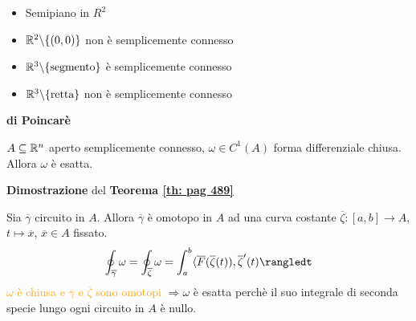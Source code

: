	
\begin{exbar}
\begin{example}
		\begin{itemize}
			\item Semipiano in $R^2$\\
			
			\segnaposto %
			
			\item $\mathbb{R}^2 \backslash \{(0,0)\}$ non è semplicemente connesso\\
			
			\segnaposto %
			
			\item $\mathbb{R}^3 \backslash \{\text{segmento}\}$ è semplicemente connesso\\
			
			\segnaposto %
			
			\item $\mathbb{R}^3 \backslash \{\text{retta}\}$ non è semplicemente connesso\\
			
			\segnaposto %
		\end{itemize}
\end{example}
\end{exbar}
	
	
\begin{theorem} \textbf{di Poincarè}
	
	\label{th: pag 489}
	$A \subseteq \mathbb{R}^n$ aperto semplicemente connesso, $\omega \in C^1(A)$ forma differenziale chiusa. Allora $\omega$ è esatta. 
\end{theorem}


\begin{dembar}
	\textbf{Dimostrazione} del \textbf{Teorema \ref{th: pag 489}}
	
	Sia $\overline{\gamma}$ circuito in $A$. Allora $\overline{\gamma}$ è omotopo in $A$ ad una curva costante $\overline{\zeta}:[a,b]\rightarrow A$, $t \mapsto \overline{x}$, $\overline{x}\in A$ fissato.
	\begin{equation*}
		\oint_{\overline{\gamma}} \omega = \oint_{\overline{\zeta}} \omega= \int_a^b \langle \overline{F}(\overline{\zeta}(t)), \overline{\zeta}'(t)\rangledt
	\end{equation*}
	\textcolor{orange}{$\omega$ è chiusa e $\overline{\gamma}$ e $\overline{\zeta}$ sono omotopi}
	$\Rightarrow \omega$ è esatta perchè il suo integrale di seconda specie lungo ogni circuito in $A$ è nullo.
\end{dembar}
	
